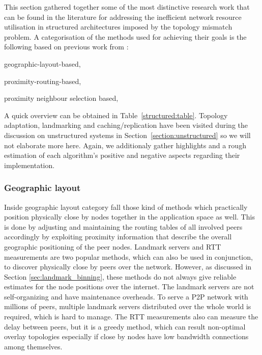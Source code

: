 This section gathered together some of the most distinctive research work that
can be found in the literature for addressing the inefficient network resource
utilisation in structured architectures imposed by the topology mismatch
problem. A categorisation of the methods used for achieving their goals is the
following based on previous work from
\cite{castro_proximitydht_2002,castro_topawareroute_2002,ratnasamy_openq_2002}:
\begin{inparaenum}
  \item geographic-layout-based,
  \item proximity-routing-based,
  \item proximity neighbour selection based,
\end{inparaenum}

A quick overview can be obtained in Table~\ref{structured:table}. Topology
adaptation, landmarking and caching/replication have been visited during the
discussion on unstructured systems in Section~\ref{section:unstructured} so
we will not elaborate more here. Again, we additionaly gather highlights and a
rough estimation of each algorithm's positive and negative aspects regarding
their implementation.





\subsubsection{Geographic layout} \label{section:geographic_layout}
Inside geographic layout category fall those kind of methods which practically
position physically close by nodes together in the application space as well.
This is done by adjusting and maintaining the routing tables of all involved
peers accordingly by exploiting proximity information that describe the overall
geographic positioning of the peer nodes. Landmark servers and RTT measurements
are two popular methods, which can also be used in conjunction, to discover
physically close by peers over the network. However, as discussed in Section
\ref{sec:landmark_binning}, these methods do not always give reliable estimates
for the node positions over the internet. The landmark servers are not
self-organizing and have maintenance overheads. To serve a P2P network with
millions of peers, multiple landmark servers distributed over the whole world is
required, which is hard to manage. The RTT measurements also can measure the
delay between peers, but it is a greedy method, which can result non-optimal
overlay topologies especially if close by nodes have low bandwidth connections
among themselves.

